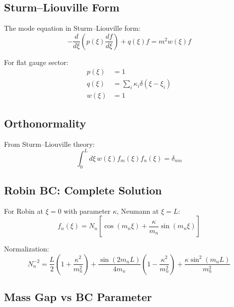 \documentclass[11pt,a4paper]{article}
\begin{document}
\subsection{Sturm--Liouville Form}

The mode equation in Sturm--Liouville form:
\begin{equation}
  -\frac{d}{d\xi}\left( p(\xi) \frac{df}{d\xi} \right) + q(\xi) f = m^2 w(\xi) f
  \label{eq:app-sl-form}
\end{equation}

For flat gauge sector:
\begin{align}
  p(\xi) &= 1
  \label{eq:sl-p} \\
  q(\xi) &= \sum_i \kappa_i \delta(\xi - \xi_i)
  \label{eq:sl-q} \\
  w(\xi) &= 1
  \label{eq:sl-w}
\end{align}

\subsection{Orthonormality}

From Sturm--Liouville theory:
\begin{equation}
  \int_0^L d\xi \, w(\xi) f_m(\xi) f_n(\xi) = \delta_{mn}
  \label{eq:app-orthonormality}
\end{equation}

\subsection{Robin BC: Complete Solution}

For Robin at $\xi=0$ with parameter $\kappa$, Neumann at $\xi=L$:
\begin{equation}
  f_n(\xi) = N_n \left[ \cos(m_n \xi) + \frac{\kappa}{m_n} \sin(m_n \xi) \right]
  \label{eq:app-robin-solution}
\end{equation}

Normalization:
\begin{equation}
  N_n^{-2} = \frac{L}{2}\left(1 + \frac{\kappa^2}{m_n^2}\right)
    + \frac{\sin(2m_n L)}{4m_n}\left(1 - \frac{\kappa^2}{m_n^2}\right)
    + \frac{\kappa \sin^2(m_n L)}{m_n^2}
  \label{eq:app-robin-norm}
\end{equation}

\subsection{Mass Gap vs BC Parameter}
\end{document}
